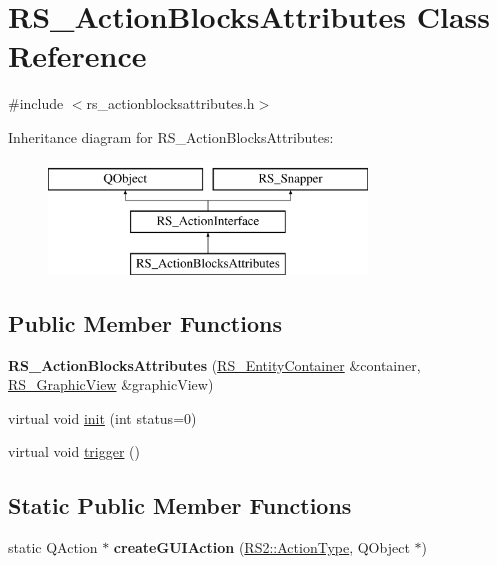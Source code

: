 \hypertarget{classRS__ActionBlocksAttributes}{\section{R\-S\-\_\-\-Action\-Blocks\-Attributes Class Reference}
\label{classRS__ActionBlocksAttributes}
}


{\ttfamily \#include $<$rs\-\_\-actionblocksattributes.\-h$>$}

Inheritance diagram for R\-S\-\_\-\-Action\-Blocks\-Attributes\-:\begin{figure}[H]
\begin{center}
\leavevmode
\includegraphics[height=3.000000cm]{classRS__ActionBlocksAttributes}
\end{center}
\end{figure}
\subsection*{Public Member Functions}
\begin{DoxyCompactItemize}
\item 
\hypertarget{classRS__ActionBlocksAttributes_abcbccfec69152726485efbfc9a1b0eb0}{{\bfseries R\-S\-\_\-\-Action\-Blocks\-Attributes} (\hyperlink{classRS__EntityContainer}{R\-S\-\_\-\-Entity\-Container} \&container, \hyperlink{classRS__GraphicView}{R\-S\-\_\-\-Graphic\-View} \&graphic\-View)}\label{classRS__ActionBlocksAttributes_abcbccfec69152726485efbfc9a1b0eb0}

\item 
virtual void \hyperlink{classRS__ActionBlocksAttributes_add4be693b455d0202d652a7eb8b0f098}{init} (int status=0)
\item 
virtual void \hyperlink{classRS__ActionBlocksAttributes_a07197deb35376c7ffc86add81edd8e05}{trigger} ()
\end{DoxyCompactItemize}
\subsection*{Static Public Member Functions}
\begin{DoxyCompactItemize}
\item 
\hypertarget{classRS__ActionBlocksAttributes_a0c82e636d8f34798dda8c967b1d20075}{static Q\-Action $\ast$ {\bfseries create\-G\-U\-I\-Action} (\hyperlink{classRS2_afe3523e0bc41fd637b892321cfc4b9d7}{R\-S2\-::\-Action\-Type}, Q\-Object $\ast$)}\label{classRS__ActionBlocksAttributes_a0c82e636d8f34798dda8c967b1d20075}

\end{DoxyCompactItemize}

